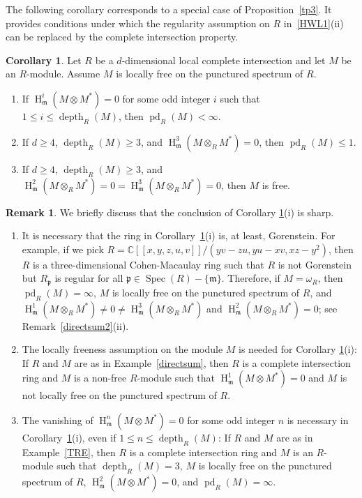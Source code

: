 \documentclass[11pt]{amsart}
\theoremstyle{definition}
\newtheorem{cor}[thm]{Corollary}
\theoremstyle{definition}
\newtheorem{rmk}[thm]{Remark}
\numberwithin{equation}{section}
\newcommand{\fm}{\mathfrak{m}}
\newcommand{\fp}{\mathfrak{p}}
\DeclareMathOperator{\depth}{depth}
\DeclareMathOperator{\hh}{H}
\DeclareMathOperator{\pd}{pd}
\DeclareMathOperator{\Spec}{Spec}
\begin{document}
The following corollary corresponds to a special case of Proposition~\ref{tp3}. It provides conditions under which the regularity assumption on $R$ in~\ref{HWL1}(ii) can be replaced by the complete intersection property.

\begin{cor} \label{tp3c1} Let $R$ be a $d$-dimensional local complete intersection and let $M$ be an $R$-module. Assume $M$ is locally free on the punctured spectrum of $R$.
\begin{enumerate}[\rm(i)]
\item If $\hh^i_{\fm}(M\otimes M^{\ast})=0$ for some odd integer $i$ such that $1\leq i \leq \depth_R(M)$, then $\pd_R(M)<\infty$. 
\item If $d\geq 4$, $\depth_R(M)\geq 3$, and $\hh^3_{\fm}(M\otimes_RM^*)=0$, then $\pd_R(M)\leq 1$. 
\item If $d\geq 4$, $\depth_R(M)\geq 3$, and $\hh^2_{\fm}(M\otimes_RM^*)=0=\hh^3_{\fm}(M\otimes_RM^*)=0$, then $M$ is free.
\end{enumerate}
\end{cor}

\begin{rmk} We briefly discuss that the conclusion of Corollary \ref{tp3c1}(i) is sharp.
\begin{enumerate}[\rm(i)]
\item It is necessary that the ring in Corollary~\ref{tp3c1}(i) is, at least, Gorenstein. For example, if we pick $R=\mathbb{C}[\![x, y, z, u, v]\!]/(yv-zu, yu-xv, xz-y^2)$, then 
$R$ is a three-dimensional Cohen-Macaulay ring such that $R$ is not Gorenstein but $R_{\fp}$ is regular for all $\fp \in \Spec(R)-\{\fm\}$. Therefore, if $M=\omega_R$, then $\pd_R(M)=\infty$, $M$ is locally free on the punctured spectrum of $R$, and $\hh^{1}_{\fm}(M\otimes _R M^\ast)\neq 0 \neq \hh^{3}_{\fm}(M\otimes _R M^\ast)$ and $\hh^{2}_{\fm}(M\otimes _R M^\ast)=0$; see Remark~\ref{directsum2}(ii). 
\item The locally freeness assumption on the module $M$ is needed for Corollary \ref{tp3c1}(i): If $R$ and $M$ are as in Example~\ref{directsum}, then $R$ is a complete intersection ring and $M$ is a non-free $R$-module such that $\hh^1_{\fm}(M\otimes M^{\ast})=0$ and $M$ is not locally free on the punctured spectrum of $R$.
\item The vanishing of $\hh^n_{\fm}(M\otimes M^{\ast})=0$ for some odd integer $n$ is necessary in Corollary~\ref{tp3c1}(i), even if $1\leq n \leq \depth_R(M)$:
If $R$ and $M$ are as in Example~\ref{TRE}, then $R$ is a complete intersection ring and $M$ is an $R$-module such that $\depth_R(M)=3$, $M$ is locally free on the punctured spectrum of $R$, $\hh^2_{\fm}(M\otimes M^{\ast})=0$, and $\pd_R(M)=\infty$.
\end{enumerate}
\end{rmk}
\end{document}
